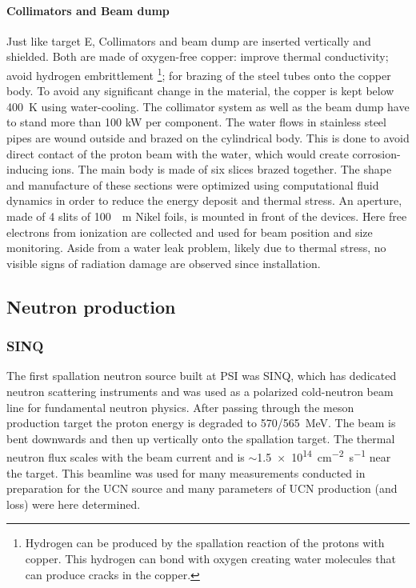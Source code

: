 \begin{refsection}
        \paragraph{Collimators and Beam dump}
        Just like target E, Collimators and beam dump are inserted vertically and shielded.
        Both are made of oxygen-free copper: improve thermal conductivity; avoid hydrogen embrittlement \footnote{Hydrogen can be produced by the spallation reaction of the protons with copper. This hydrogen can bond with oxygen creating water molecules that can produce cracks in the copper.}; for brazing of the steel tubes onto the copper body.
        To avoid any significant change in the material, the copper is kept below \SI{400}{K} using water-cooling.
        The collimator system as well as the beam dump have to stand more than 100 kW per component.
        The water flows in stainless steel pipes are wound outside and brazed on the cylindrical body. 
        This is done to avoid direct contact of the proton beam with the water, which would create corrosion-inducing ions.
        The main body is made of six slices brazed together.
        The shape and manufacture of these sections were optimized using computational fluid dynamics in order to reduce the energy deposit and thermal stress.
        An aperture, made of 4 slits of \SI{100}{\mu m} Nikel foils, is mounted in front of the devices.
        Here free electrons from ionization are collected and used for beam position and size monitoring.
        Aside from a water leak problem, likely due to thermal stress, no visible signs of radiation damage are observed since installation.
        
    \subsection{Neutron production}
        \label{sec:nproduction}
        \subsubsection{SINQ}
            The first spallation neutron source built at PSI was SINQ, which has dedicated neutron scattering instruments and was used as a polarized cold-neutron beam line for fundamental neutron physics.
            After passing through the meson production target the proton energy is degraded to \SI{570/565}{MeV}. 
            The beam is bent downwards and then up vertically onto the spallation target.
            The thermal neutron flux scales with the beam current and is $\sim$\SI{1.5e14}{cm^{-2}s^{-1}} near the target.
            This beamline was used for many measurements conducted in preparation for the UCN source and many parameters of UCN production (and loss) were here determined.
            

\end{refsection}
